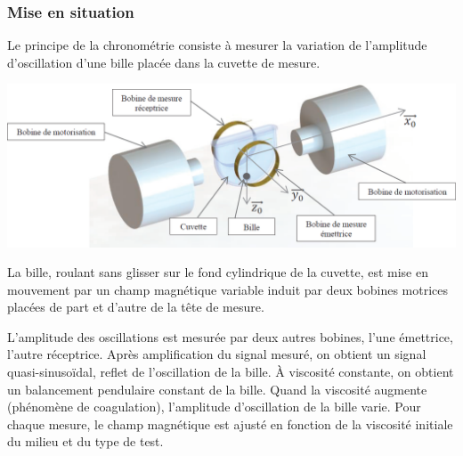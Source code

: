 \documentclass[10pt,fleqn]{article} %
\begin{document}
\subsubsection{Mise en situation}
Le principe de la chronométrie consiste à mesurer la variation de l’amplitude d’oscillation d’une
bille placée dans la cuvette de mesure.

\begin{center}
\includegraphics[width=\linewidth]{images/ccp_04}
\end{center}

La bille, roulant sans glisser sur le fond cylindrique de la cuvette, est mise en mouvement par un
champ magnétique variable induit par deux bobines motrices placées de part et d’autre de la tête de
mesure.

L’amplitude des oscillations est mesurée par deux autres bobines, l’une émettrice, l’autre réceptrice.
Après amplification du signal mesuré, on obtient un signal quasi-sinusoïdal, reflet de l’oscillation
de la bille. À viscosité constante, on obtient un balancement pendulaire constant de la bille. Quand
la viscosité augmente (phénomène de coagulation), l’amplitude d’oscillation de la bille varie.
Pour chaque mesure, le champ magnétique est ajusté en fonction de la viscosité initiale du milieu et
du type de test.
\end{document}
